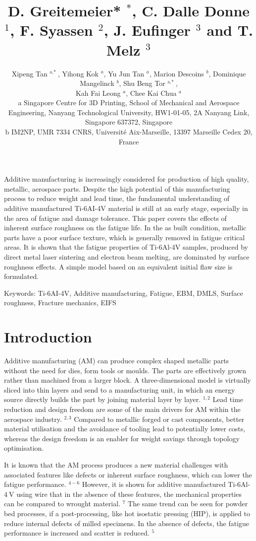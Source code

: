 \documentclass[10pt]{article}
\title{D. Greitemeier* ${ }^{*}$, C. Dalle Donne ${ }^{1}$, F. Syassen ${ }^{2}$, J. Eufinger ${ }^{3}$ and T. Melz ${ }^{3}$ }
\author{Xipeng Tan ${ }^{\text {a,* }}$, Yihong Kok $^{a}$, Yu Jun Tan ${ }^{a}$, Marion Descoins ${ }^{b}$, Dominique Mangelinck ${ }^{b}$, Shu Beng Tor ${ }^{\text {a,* }}$,\\
Kah Fai Leong ${ }^{a}$, Chee Kai Chua ${ }^{a}$\\
a Singapore Centre for 3D Printing, School of Mechanical and Aerospace Engineering, Nanyang Technological University, HW1-01-05, 2A Nanyang Link, Singapore 637372, Singapore\\
b IM2NP, UMR 7334 CNRS, Université Aix-Marseille, 13397 Marseille Cedex 20, France}
\date{}
\begin{document}
\maketitle
Additive manufacturing is increasingly considered for production of high quality, metallic, aerospace parts. Despite the high potential of this manufacturing process to reduce weight and lead time, the fundamental understanding of additive manufactured Ti-6AI-4V material is still at an early stage, especially in the area of fatigue and damage tolerance. This paper covers the effects of inherent surface roughness on the fatigue life. In the as built condition, metallic parts have a poor surface texture, which is generally removed in fatigue critical areas. It is shown that the fatigue properties of Ti-6Al-4V samples, produced by direct metal laser sintering and electron beam melting, are dominated by surface roughness effects. A simple model based on an equivalent initial flaw size is formulated.

Keywords: Ti-6AI-4V, Additive manufacturing, Fatigue, EBM, DMLS, Surface roughness, Fracture mechanics, EIFS

\section*{Introduction}
Additive manufacturing (AM) can produce complex shaped metallic parts without the need for dies, form tools or moulds. The parts are effectively grown rather than machined from a larger block. A three-dimensional model is virtually sliced into thin layers and send to a manufacturing unit, in which an energy source directly builds the part by joining material layer by layer. ${ }^{1,2}$ Lead time reduction and design freedom are some of the main drivers for AM within the aerospace industry. ${ }^{2,3}$ Compared to metallic forged or cast components, better material utilisation and the avoidance of tooling lead to potentially lower costs, whereas the design freedom is an enabler for weight savings through topology optimisation.

It is known that the AM process produces a new material challenges with associated features like defects or inherent surface roughness, which can lower the fatigue performance. ${ }^{4-6}$ However, it is shown for additive manufactured Ti-6Al- $4 \mathrm{~V}$ using wire that in the absence of these features, the mechanical properties can be compared to wrought material. ${ }^{7}$ The same trend can be seen for powder bed processes, if a post-processing, like hot isostatic pressing (HIP), is applied to reduce internal defects of milled specimens. In the absence of defects, the fatigue performance is increased and scatter is reduced. ${ }^{5}$
\end{document}

